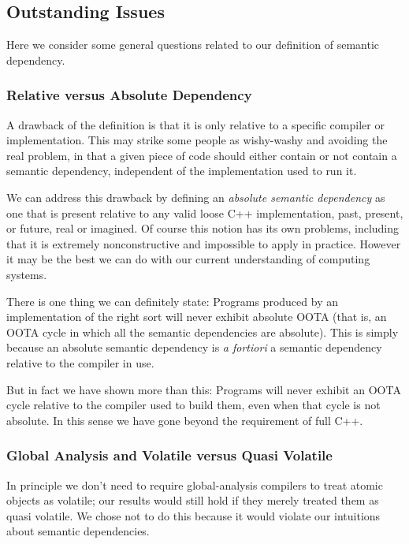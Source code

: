 \documentclass[10]{article}
\begin{document}
\subsection{Outstanding Issues}
\label{sec:Outstanding Issues}

Here we consider some general questions related to our definition of
semantic dependency.

\subsubsection{Relative versus Absolute Dependency}
\label{sec:Relative versus Absolute Dependency}

A drawback of the definition is that it is only relative to a specific
compiler or implementation.
This may strike some people as wishy-washy and avoiding the real
problem, in that a given piece of code should either contain or not
contain a semantic dependency, independent of the implementation used to
run it.

We can address this drawback by defining an \emph{absolute semantic
dependency} as one that is present relative to any valid loose C++
implementation, past, present, or future, real or imagined.
Of course this notion has its own problems, including that it is
extremely nonconstructive and impossible to apply in practice.
However it may be the best we can do with our current understanding
of computing systems.

There is one thing we can definitely state:
Programs produced by an implementation of the right sort will never
exhibit absolute OOTA (that is, an OOTA cycle in which all the
semantic dependencies are absolute).
This is simply because an absolute semantic dependency is {\it
a fortiori\/} a semantic dependency relative to the compiler in use.

But in fact we have shown more than this:
Programs will never exhibit an OOTA cycle relative to the compiler
used to build them, even when that cycle is not absolute.
In this sense we have gone beyond the requirement of full C++.

\subsubsection{Global Analysis and Volatile versus Quasi Volatile}
\label{sec:Global Analysis and Volatile versus Quasi Volatile}

In principle we don't need to require global-analysis compilers to
treat atomic objects as volatile; our results would still hold if they
merely treated them as quasi volatile.
We chose not to do this because it would violate our intuitions about
semantic dependencies.
\end{document}
